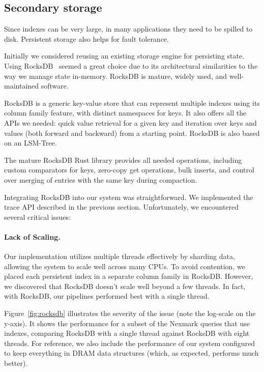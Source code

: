 \subsection{Secondary storage}

Since indexes can be very large, in many applications they need to be
spilled to disk.  Persistent storage also helps for fault tolerance.

Initially we considered reusing an existing storage engine for
persisting state.  Using RocksDB~\cite{dong-ats21} seemed a great
choice due to its architectural similarities to the way we manage state
in-memory.  RocksDB is mature, widely used, and well-maintained
software.

RocksDB is a generic key-value store that can represent multiple
indexes using its column family feature, with distinct namespaces for
keys. It also offers all the APIs we needed: quick value retrieval for
a given key and iteration over keys and values (both forward and
backward) from a starting point.  RocksDB is also based on an
LSM-Tree.

The mature RocksDB Rust library provides all need\-ed operations,
including custom comparators for keys, zero-copy get operations, bulk
inserts, and control over merging of entries with the same key during
compaction.

Integrating RocksDB into our system was straightforward.  We
implemented the trace API described in the previous section.
Unfortunately, we encountered several critical issues:

\paragraph{Lack of Scaling.} Our implementation utilizes multiple threads
effectively by sharding data, allowing the system to scale well across
many CPUs.  To avoid contention, we placed each persistent index in a
separate column family in RocksDB. However, we discovered that RocksDB
doesn't scale well beyond a few threads. In fact, with RocksDB, our
pipelines performed best with a single thread.

Figure~\ref{fig:rocksdb} illustrates the severity of the issue (note
the log-scale on the y-axis). It shows the performance for a subset of
the Nexmark queries that use indexes, comparing RocksDB with a single
thread against RocksDB with eight threads. For reference, we also
include the performance of our system configured to keep everything in
DRAM data structures (which, as expected, performs much better).

